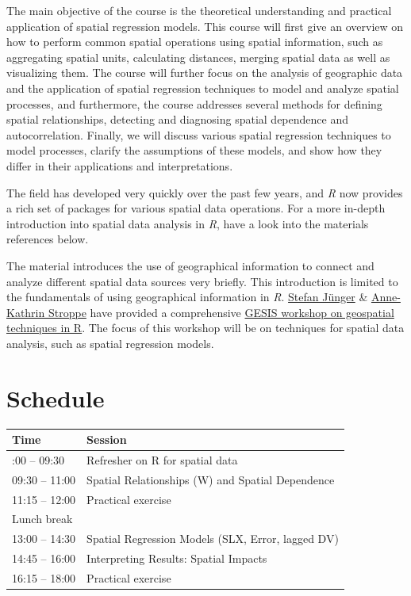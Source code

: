 \documentclass[
  letterpaper,
  DIV=11,
  numbers=noendperiod]{scrreprt}
\begin{document}
The main objective of the course is the theoretical understanding and
practical application of spatial regression models. This course will
first give an overview on how to perform common spatial operations using
spatial information, such as aggregating spatial units, calculating
distances, merging spatial data as well as visualizing them. The course
will further focus on the analysis of geographic data and the
application of spatial regression techniques to model and analyze
spatial processes, and furthermore, the course addresses several methods
for defining spatial relationships, detecting and diagnosing spatial
dependence and autocorrelation. Finally, we will discuss various spatial
regression techniques to model processes, clarify the assumptions of
these models, and show how they differ in their applications and
interpretations.

The field has developed very quickly over the past few years, and
\emph{R} now provides a rich set of packages for various spatial data
operations. For a more in-depth introduction into spatial data analysis
in \emph{R}, have a look into the materials references below.

The material introduces the use of geographical information to connect
and analyze different spatial data sources very briefly. This
introduction is limited to the fundamentals of using geographical
information in \emph{R}. \href{https://stefanjuenger.github.io/}{Stefan
Jünger} \&
\href{https://www.gesis.org/institut/mitarbeitendenverzeichnis/person/Anne-Kathrin.Stroppe}{Anne-Kathrin
Stroppe} have provided a comprehensive
\href{https://github.com/StefanJuenger/gesis-workshop-geospatial-techniques-R-2023}{GESIS
workshop on geospatial techniques in R}. The focus of this workshop will
be on techniques for spatial data analysis, such as spatial regression
models.

\hypertarget{schedule}{%
\section*{Schedule}\label{schedule}}


\begin{longtable}[]{@{}ll@{}}
\toprule\noalign{}
Time & Session \\
\midrule\noalign{}
\endhead
\bottomrule\noalign{}
\endlastfoot
09:00 -- 09:30 & Refresher on R for spatial data \\
09:30 -- 11:00 & Spatial Relationships (W) and Spatial Dependence \\
11:15 -- 12:00 & Practical exercise \\
Lunch break & \\
13:00 -- 14:30 & Spatial Regression Models (SLX, Error, lagged DV) \\
14:45 -- 16:00 & Interpreting Results: Spatial Impacts \\
16:15 -- 18:00 & Practical exercise \\
\end{longtable}
\end{document}
